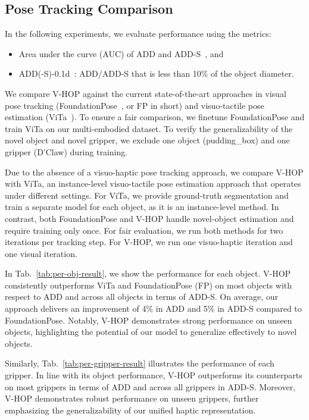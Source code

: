 \documentclass[11pt, a4paper, logo, twocolumn]{brown}
\newcommand{\shortname}{V-HOP\xspace}
\begin{document}
\subsection{Pose Tracking Comparison}
In the following experiments, we evaluate performance using the metrics:
\begin{itemize}
    \item Area under the curve (AUC) of ADD and ADD-S~\cite{hinterstoisser_model_2013, xiang_posecnn_2018}, and
    \item ADD(-S)-0.1d~\cite{he_onepose_2022}: ADD/ADD-S that is less than 10\% of the object diameter.
\end{itemize}

We compare \shortname against the current state-of-the-art approaches in visual pose tracking (FoundationPose~\cite{wen_foundationpose_2024}, or FP in short) and visuo-tactile pose estimation (ViTa~\cite{dikhale_visuotactile_2022}).
To ensure a fair comparison, we finetune FoundationPose and train ViTa on our multi-embodied dataset.
To verify the generalizability of the novel object and novel gripper, we exclude one object (pudding\_box) and one gripper (D'Claw) during training. 

Due to the absence of a visuo-haptic pose tracking approach, we compare \shortname with ViTa, an instance-level visuo-tactile pose estimation approach that operates under different settings.
For ViTa, we provide ground-truth segmentation and train a separate model for each object, as it is an instance-level method. 
In contrast, both FoundationPose and \shortname handle novel-object estimation and require training only once.
For fair evaluation, we run both methods for two iterations per tracking step. 
For \shortname, we run one visuo-haptic iteration and one visual iteration.

In Tab.~\ref{tab:per-obj-result}, we show the performance for each object.
\shortname consistently outperforms ViTa and FoundationPose (FP) on most objects with respect to ADD and across all objects in terms of ADD-S.
On average, our approach delivers an improvement of 4\% in ADD and 5\% in ADD-S compared to FoundationPose.
Notably, \shortname demonstrates strong performance on unseen objects, highlighting the potential of our model to generalize effectively to novel objects.

Similarly, Tab.~\ref{tab:per-gripper-result} illustrates the performance of each gripper. 
In line with its object performance, \shortname outperforms its counterparts on most grippers in terms of ADD and across all grippers in ADD-S. 
Moreover, \shortname demonstrates robust performance on unseen grippers, further emphasizing the generalizability of our unified haptic representation.
\end{document}
